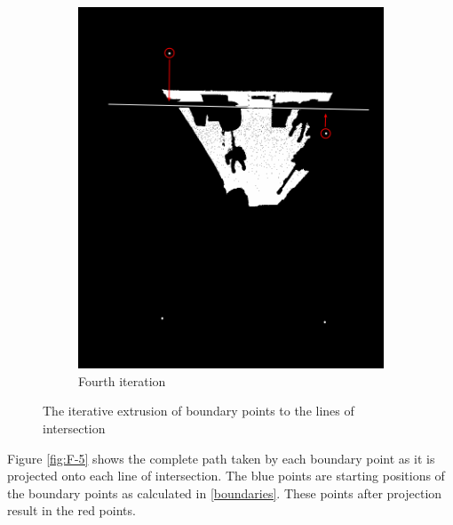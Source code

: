 \begin{figure}[H]
\begin{subfigure}[b]{0.4\linewidth}
					\includegraphics[width=0.95\linewidth]{"Includes/images/Project Points/F-4"} 
					\caption{Fourth iteration} 
					\label{fig4Adjust:d} 
				\end{subfigure} 
				\caption{The iterative extrusion of boundary points to the lines of intersection}
				\label{fig:4Adjust} 
			\end{figure}
			
			Figure \ref{fig:F-5} shows the complete path taken by each boundary point as it is projected onto each line of intersection. The blue points are starting positions of the boundary points as calculated in \ref{boundaries}. These points after projection result in the red points.

